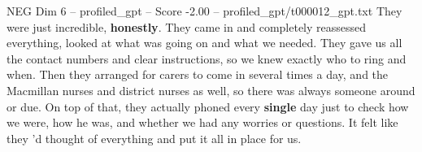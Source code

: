 \begin{textsample}{NEG Dim 6 – profiled\_gpt – Score -2.00 – profiled\_gpt/t000012\_gpt.txt}  \label{ex:f6_neg_012}
They were just incredible, \textbf{honestly}.
They came in and completely reassessed everything, looked at what was going on and what we needed.
They gave us all the contact numbers and clear instructions, so we knew exactly who to ring and when.
Then they arranged for carers to come in several times a day, and the Macmillan nurses and district nurses as well, so there was always someone around or due.
On top of that, they actually phoned every \textbf{single} day just to check how we were, how he was, and whether we had any worries or questions.
It felt like they ’d thought of everything and put it all in place for us.

\end{textsample}
